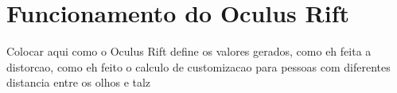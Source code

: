 \section{Funcionamento do Oculus Rift}
Colocar aqui como o Oculus Rift define os valores gerados, como eh feita a distorcao, como eh feito o calculo de customizacao para pessoas com diferentes distancia entre os olhos e talz